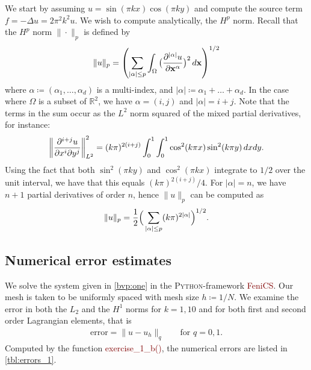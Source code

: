 \documentclass[]{article}
\renewcommand{\texttt}[1]{\textcolor{Maroon}{#1}}
\newcommand{\lapl}{\Delta}
\newcommand{\x}{\mathbf{x}}
\begin{document}
We start by assuming $u = \sin(\pi k x)\cos(\pi k y)$ and compute the source
term $f = -\lapl u = 2\pi^2 k^2 u$.
We wish to compute analytically, the $H^p$ norm.  Recall that the $H^p$  norm
$\| \cdot \|_p$ is defined by
\begin{equation}
    \notag
    \| u \|_p = \left( \sum^{}_{|\alpha|\leq p} \int_\Omega
    \big(\frac{\partial^{|\alpha|} u}{\partial \x^\alpha}\big)^2 \, d\x
\right)^{1/2}
\end{equation}
where $\alpha \coloneqq (\alpha_1, \ldots, \alpha_d)$ is a multi-index, and
$|\alpha| \coloneqq \alpha_1 + \ldots + \alpha_d$. In the case where $\Omega$
is a subset of $\mathbb{R}^2$, we have $\alpha = (i, j)$ and $|\alpha| = i +
j$. Note that the terms in the sum occur as the $L^2$ norm squared of the mixed
partial derivatives, for instance:
\begin{align*}
    \notag
    \left\| \frac{\partial^{i+j}u}{\partial x^i \partial y^j} \right\|_{L^2}^2
    = (k \pi)^{2(i+j)}\int_0^1\int_0^1 \cos^2(k\pi x) \sin^2(k\pi y) \, dx dy.
\end{align*}
Using the fact that both $\sin^2(\pi k y)$ and $\cos^2(\pi k x)$ integrate to
$1/2$ over the unit interval, we have that this equals $(k \pi)^{2(i+j)}/4$.
For $|\alpha| = n$, we have $n + 1$ partial derivatives of order $n$, hence
$\| u\|_p$ can be computed as
\begin{equation}
    \notag
    \| u \|_p = \frac{1}{2} 
    \Big(\sum^{}_{|\alpha| \leq p} (k\pi)^{2|\alpha|}\Big)^{1/2}.
\end{equation}

\subsection*{Numerical error estimates}
\label{sub:simulations}

We solve the system given in \cref{bvp:one} in the \textsc{Python}-framework
\texttt{FeniCS}. Our mesh is taken to be uniformly spaced with mesh size $h
\coloneqq 1 / N$. We examine the error in both the $L_2$ and the $H^1$ norms
for $k = 1, 10$ and for both first and second order Lagrangian elements, that is
\begin{align*}
    \text{error} = \| u - u_h \|_q && \text{ for } q = 0, 1.
\end{align*}
Computed by the function \texttt{exercise\_1\_b()}, the numerical errors are
listed in \cref{tbl:errors_1}. 
\end{document}
